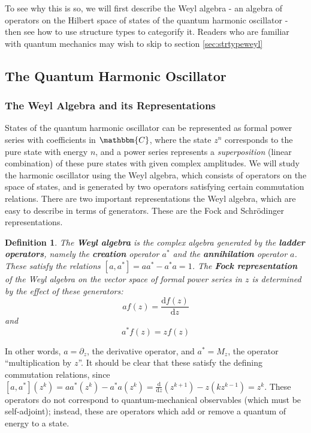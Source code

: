 \documentclass{amsart} \usepackage{amsmath,amssymb,bbm}
\newtheorem{definition}{Definition}
\newcommand{\mathd}{\mathrm{d}}
\begin{document}
To see why this is so, we will first describe the Weyl algebra - an algebra of
operators on the Hilbert space of states of the quantum harmonic oscillator -
then see how to use structure types to categorify it.  Readers who are familiar with quantum mechanics may wish to skip to section \ref{sec:strtypeweyl}

\subsection{The Quantum Harmonic Oscillator}

\subsubsection{The Weyl Algebra and its Representations}

States of the quantum harmonic oscillator can be represented as formal
power series with coefficients in $\mathbbm{C}$, where the state $z^n$
corresponds to the pure state with energy $n$, and a power series
represents a \textit{superposition} (linear combination) of these pure
states with given complex amplitudes.  We will study the harmonic
oscillator using the Weyl algebra, which consists of operators on the
space of states, and is generated by two operators satisfying certain
commutation relations.  There are two important representations the
Weyl algebra, which are easy to describe in terms of generators.
These are the Fock and Schr\"odinger representations.

\begin{definition}
  The {\textbf{Weyl algebra}} is the complex algebra generated by the
  {\textbf{ladder operators}}, namely the {\textbf{creation}} operator
  $a^{\ast}$ and the {\textbf{annihilation}} operator $a$.  These
  satisfy the relations $[a,a^{\ast} ] =a a^{\ast} -a^{\ast} a= 1$.
  The {\textbf{Fock representation}} of the Weyl algebra on the vector
  space of formal power series in $z$ is determined by the effect of
  these generators: \begin{equation}
     af ( z ) = \frac{\mathd f ( z )}{\mathd z}
  \end{equation}
  and
  \begin{equation}
     a^{\ast} f ( z ) = z f ( z )
  \end{equation}
\end{definition}

In other words, $a= \partial_z$, the derivative operator, and
$a^{\ast} = M_z$, the operator ``multiplication by $z$''.  It should
be clear that these satisfy the defining commutation relations, since
$[a,a^{\ast} ] ( z^k ) =a a^{\ast} ( z^k ) -a^{\ast} a( z^k ) =
\frac{\mathd}{\mathd z} ( z^{k + 1} ) - z ( k z^{k - 1} ) = z^k$.
These operators do not correspond to quantum-mechanical observables
(which must be self-adjoint); instead, these are operators which add
or remove a quantum of energy to a state.
\end{document}
